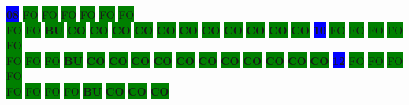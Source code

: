 \colorbox{blue}{\color[rgb]{1,0,0}\textbf{08}}%
\colorbox{green}{\color[gray]{0.75}FO}%
\colorbox{green}{\color[gray]{0.75}FO}%
\colorbox{green}{\color[gray]{0.75}FO}%
\colorbox{green}{\color[gray]{0.75}FO}%
\colorbox{green}{\color[gray]{0.75}FO}%
\colorbox{green}{\color[gray]{0.75}FO}%
\\
\colorbox{green}{\color[gray]{0.75}FO}%
\colorbox{green}{\color[gray]{0.75}FO}%
\colorbox{green}{\color[rgb]{1,0,0}\textbf{BU}}%
\colorbox{green}{\color[rgb]{0,0,0}\textbf{CO}}%
\colorbox{green}{\color[rgb]{0,0,0}\textbf{CO}}%
\colorbox{green}{\color[rgb]{0,0,0}\textbf{CO}}%
\colorbox{green}{\color[rgb]{0,0,0}\textbf{CO}}%
\colorbox{green}{\color[rgb]{0,0,0}\textbf{CO}}%
\colorbox{green}{\color[rgb]{0,0,0}\textbf{CO}}%
\colorbox{green}{\color[rgb]{0,0,0}\textbf{CO}}%
\colorbox{green}{\color[rgb]{0,0,0}\textbf{CO}}%
\colorbox{green}{\color[rgb]{0,0,0}\textbf{CO}}%
\colorbox{green}{\color[rgb]{0,0,0}\textbf{CO}}%
\colorbox{green}{\color[rgb]{0,0,0}\textbf{CO}}%
\colorbox{blue}{\color[rgb]{1,0,0}\textbf{10}}%
\colorbox{green}{\color[gray]{0.75}FO}%
\colorbox{green}{\color[gray]{0.75}FO}%
\colorbox{green}{\color[gray]{0.75}FO}%
\colorbox{green}{\color[gray]{0.75}FO}%
\colorbox{green}{\color[gray]{0.75}FO}%
\\
\colorbox{green}{\color[gray]{0.75}FO}%
\colorbox{green}{\color[gray]{0.75}FO}%
\colorbox{green}{\color[gray]{0.75}FO}%
\colorbox{green}{\color[rgb]{1,0,0}\textbf{BU}}%
\colorbox{green}{\color[rgb]{0,0,0}\textbf{CO}}%
\colorbox{green}{\color[rgb]{0,0,0}\textbf{CO}}%
\colorbox{green}{\color[rgb]{0,0,0}\textbf{CO}}%
\colorbox{green}{\color[rgb]{0,0,0}\textbf{CO}}%
\colorbox{green}{\color[rgb]{0,0,0}\textbf{CO}}%
\colorbox{green}{\color[rgb]{0,0,0}\textbf{CO}}%
\colorbox{green}{\color[rgb]{0,0,0}\textbf{CO}}%
\colorbox{green}{\color[rgb]{0,0,0}\textbf{CO}}%
\colorbox{green}{\color[rgb]{0,0,0}\textbf{CO}}%
\colorbox{green}{\color[rgb]{0,0,0}\textbf{CO}}%
\colorbox{green}{\color[rgb]{0,0,0}\textbf{CO}}%
\colorbox{blue}{\color[rgb]{1,0,0}\textbf{12}}%
\colorbox{green}{\color[gray]{0.75}FO}%
\colorbox{green}{\color[gray]{0.75}FO}%
\colorbox{green}{\color[gray]{0.75}FO}%
\colorbox{green}{\color[gray]{0.75}FO}%
\\
\colorbox{green}{\color[gray]{0.75}FO}%
\colorbox{green}{\color[gray]{0.75}FO}%
\colorbox{green}{\color[gray]{0.75}FO}%
\colorbox{green}{\color[gray]{0.75}FO}%
\colorbox{green}{\color[rgb]{1,0,0}\textbf{BU}}%
\colorbox{green}{\color[rgb]{0,0,0}\textbf{CO}}%
\colorbox{green}{\color[rgb]{0,0,0}\textbf{CO}}%
\colorbox{green}{\color[rgb]{0,0,0}\textbf{CO}}%
